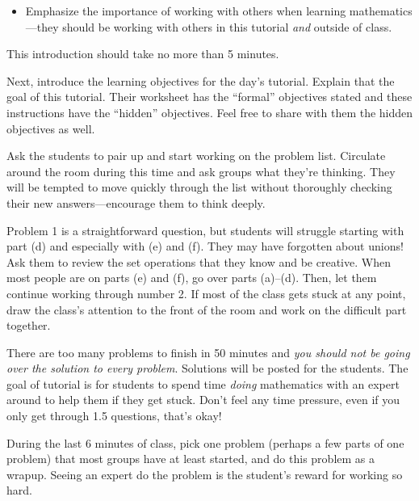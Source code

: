 \documentclass[red]{tutorial}
\theoremstyle{definition}
\theoremstyle{theorem}
\begin{document}
\begin{instructions}
\begin{itemize}
			\item Emphasize the importance of working with others when
				learning mathematics---they should be working with
				others in this tutorial \emph{and} outside of
				class.
		\end{itemize}

		This introduction should take no more than 5 minutes.

		Next, introduce the learning objectives for the day's tutorial. Explain
		that the goal of this tutorial. Their worksheet has the ``formal'' objectives
		stated and these instructions have the ``hidden'' objectives. Feel free
		to share with them the hidden objectives as well.

		Ask the students to pair up and
		start working on the problem list. Circulate around the room during
		this time and ask groups what they're thinking. They will be tempted
		to move quickly through the list without thoroughly checking their
		new answers---encourage them to think deeply.

		Problem 1 is a straightforward question, but students will struggle starting
		with part (d) and especially with (e) and (f). They may have forgotten about unions! Ask
		them to review the set operations that they know and be creative. When most people are on
		parts (e) and (f), go over parts (a)--(d). Then, let them continue working through number 2.
		If most of the class gets stuck at any point, draw the class's attention to the front
		of the room and work on the difficult part together.

		There are too many problems to finish in 50 minutes and \emph{you should not be going
		over the solution to every problem}. Solutions will be posted for the students. The goal
		of tutorial is for students to spend time \emph{doing} mathematics with an expert around
		to help them if they get stuck. Don't feel any time pressure, even if you only get through 1.5
		questions, that's okay!

		During the last 6 minutes of class, pick one problem (perhaps a few parts of one problem)
		that most groups have at least started, and do this problem as a wrapup. Seeing an expert do the
		problem is the student's reward for working so hard.


\end{instructions}
\end{document}
